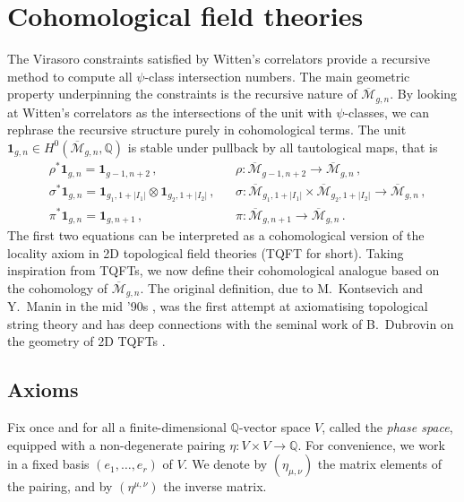 \documentclass[11pt,reqno]{amsart}
\numberwithin{equation}{section}
\newcommand{\mb}[1]{\mathbb{#1}}
\newcommand{\mc}[1]{\mathcal{#1}}
\newcommand{\Q}{\mb{Q}}
\newcommand{\M}{\mc{M}}
\newcommand{\Mbar}{\overline{\M}}
\theoremstyle{plain}
\theoremstyle{definition}
\begin{document}
\newpage
\section{Cohomological field theories}
\label{sec:CohFT}

The Virasoro constraints satisfied by Witten's correlators provide a recursive method to compute all $\psi$-class intersection numbers. The main geometric property underpinning the constraints is the recursive nature of $\Mbar_{g,n}$. By looking at Witten's correlators as the intersections of the unit with $\psi$-classes, we can rephrase the recursive structure purely in cohomological terms. The unit $\bm{1}_{g,n} \in H^0(\Mbar_{g,n},\Q)$ is stable under pullback by all tautological maps, that is
\begin{align}
  &
  \rho^* \bm{1}_{g,n} = \bm{1}_{g-1,n+2} \,,
  &&
  \rho \colon \Mbar_{g-1,n+2} \to \Mbar_{g,n} \,,\\
  &
  \sigma^* \bm{1}_{g,n} = \bm{1}_{g_1,1+|I_1|} \otimes \bm{1}_{g_2,1+|I_2|} \,,
  &&
  \sigma \colon \Mbar_{g_1,1+|I_1|} \times \Mbar_{g_2,1+|I_2|} \to \Mbar_{g,n} \,,\\
  &
  \pi^* \bm{1}_{g,n} = \bm{1}_{g,n+1} \,,
  &&
  \pi \colon \Mbar_{g,n+1} \to \Mbar_{g,n} \,.
\end{align}
The first two equations can be interpreted as a cohomological version of the locality axiom in 2D topological field theories (TQFT for short). Taking inspiration from TQFTs, we now define their cohomological analogue based on the cohomology of $\Mbar_{g,n}$. The original definition, due to M.~Kontsevich and Y.~Manin in the mid '90s \cite{KM94}, was the first attempt at axiomatising topological string theory and has deep connections with the seminal work of B.~Dubrovin on the geometry of 2D TQFTs \cite{Dub96}.

\subsection{Axioms}
Fix once and for all a finite-dimensional $\Q$-vector space $V$, called the \emph{phase space}, equipped with a non-degenerate pairing $\eta \colon V \times V \to \Q$. For convenience, we work in a fixed basis $(e_1,\ldots,e_r)$ of $V$. We denote by $(\eta_{\mu,\nu})$ the matrix elements of the pairing, and by $(\eta^{\mu,\nu})$ the inverse matrix.
\end{document}
